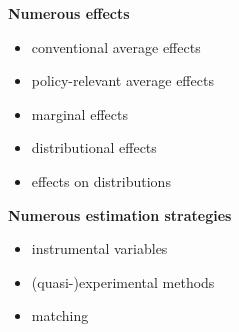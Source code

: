 \begin{frame}
\textbf{Numerous effects}\\\vspace{0.3cm}
	\begin{itemize}\setlength\itemsep{1em}
		\item conventional average effects
		\item policy-relevant average effects
		\item marginal effects
		\item distributional effects
		\item effects on distributions
	\end{itemize}
\end{frame}
\begin{frame}
\textbf{Numerous estimation strategies}\\\vspace{0.3cm}
	\begin{itemize}\setlength\itemsep{1em}
		\item instrumental variables
		\item (quasi-)experimental methods
		\item matching
	\end{itemize}
\end{frame}
